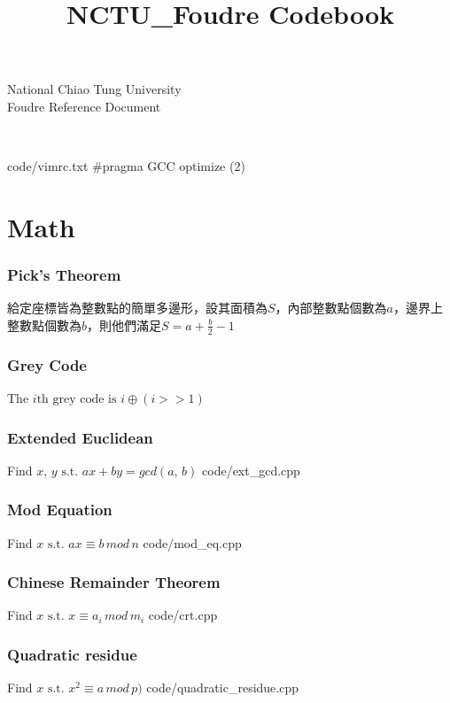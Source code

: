 \documentclass [landscape,8pt,a4paper,twocolumn]{article}
\title {NCTU\_Foudre Codebook}
\begin{document}
\thispagestyle{fancy}
{ \Huge National Chiao Tung University \\ Foudre Reference Document}
\tableofcontents

~\newline
~\newline
~\newline

 {code/vimrc.txt}
\#pragma GCC optimize (2)

\newpage
\part{Math}

\section{Pick's Theorem}
給定座標皆為整數點的簡單多邊形，設其面積為$ S $，內部整數點個數為$ a $，邊界上整數點個數為$ b $，則他們滿足$ S=a+\frac{b}{2}-1 $

\section{Grey Code}
The $ i \text{th grey code is } i \oplus (i>>1) $

\section{Extended Euclidean}
Find $ x, \, y \text{ s.t. } ax+by=gcd(a, \, b) $
 {code/ext_gcd.cpp}

\section{Mod Equation}
Find $ x \text{ s.t. } ax \equiv b \, mod \, n $
 {code/mod_eq.cpp}

\section{Chinese Remainder Theorem}
Find $ x \text{ s.t. } x \equiv a_i \, mod \, m_i $
 {code/crt.cpp}

\section{Quadratic residue}
Find $ x \text{ s.t. } x^2 \equiv a \, mod \, p) $
{code/quadratic_residue.cpp}
\end{document}
